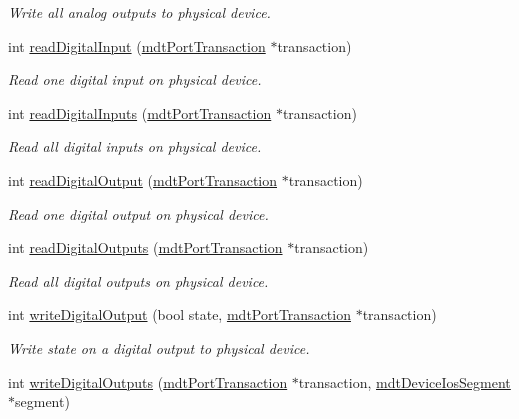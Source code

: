 \begin{DoxyCompactItemize}
\begin{DoxyCompactList}\small\item\em Write all analog outputs to physical device. \end{DoxyCompactList}\item 
int \hyperlink{classmdt_device_modbus_a9dd05e51223ee5bb79970fbe84c501f9}{read\-Digital\-Input} (\hyperlink{classmdt_port_transaction}{mdt\-Port\-Transaction} $\ast$transaction)
\begin{DoxyCompactList}\small\item\em Read one digital input on physical device. \end{DoxyCompactList}\item 
int \hyperlink{classmdt_device_modbus_a3fba9e113092f9da187cf684fb62b132}{read\-Digital\-Inputs} (\hyperlink{classmdt_port_transaction}{mdt\-Port\-Transaction} $\ast$transaction)
\begin{DoxyCompactList}\small\item\em Read all digital inputs on physical device. \end{DoxyCompactList}\item 
int \hyperlink{classmdt_device_modbus_a13a334ac86135751893f37064d8f548d}{read\-Digital\-Output} (\hyperlink{classmdt_port_transaction}{mdt\-Port\-Transaction} $\ast$transaction)
\begin{DoxyCompactList}\small\item\em Read one digital output on physical device. \end{DoxyCompactList}\item 
int \hyperlink{classmdt_device_modbus_a8915a036472bff0f356756992c1eae51}{read\-Digital\-Outputs} (\hyperlink{classmdt_port_transaction}{mdt\-Port\-Transaction} $\ast$transaction)
\begin{DoxyCompactList}\small\item\em Read all digital outputs on physical device. \end{DoxyCompactList}\item 
int \hyperlink{classmdt_device_modbus_a6950c10fc521b193fb3c754223879694}{write\-Digital\-Output} (bool state, \hyperlink{classmdt_port_transaction}{mdt\-Port\-Transaction} $\ast$transaction)
\begin{DoxyCompactList}\small\item\em Write state on a digital output to physical device. \end{DoxyCompactList}\item 
int \hyperlink{classmdt_device_modbus_a6713edaee0bfba48791008124299b753}{write\-Digital\-Outputs} (\hyperlink{classmdt_port_transaction}{mdt\-Port\-Transaction} $\ast$transaction, \hyperlink{classmdt_device_ios_segment}{mdt\-Device\-Ios\-Segment} $\ast$segment)

\end{DoxyCompactItemize}
